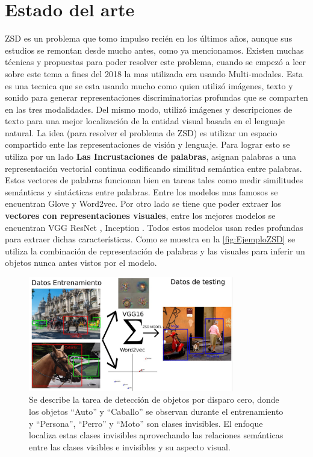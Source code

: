 \section{Estado del arte}
ZSD es un problema que tomo impulso recién en los últimos años, aunque sus estudios se remontan desde mucho antes, como ya mencionamos. Existen muchas técnicas y propuestas para poder resolver este problema, cuando se empezó a leer sobre este tema a fines del 2018 la mas utilizada era usando Multi-modales. Esta es una tecnica que se esta usando mucho como \cite{aytar2017see} quien utilizó imágenes, texto y sonido para generar representaciones discriminatorias profundas que se comparten en las tres modalidades. Del mismo modo, \cite{zhang2017discriminative} utilizó imágenes y descripciones de texto para una mejor localización de la entidad visual basada en el lenguaje natural. La idea (para resolver el problema de ZSD) es utilizar un espacio compartido ente las representaciones de visión y lenguaje.	Para lograr esto se utiliza por un lado \textbf{Las Incrustaciones de palabras}, asignan palabras a una representación vectorial continua codificando similitud semántica entre palabras. Estos vectores de palabras funcionan bien en tareas tales como medir similitudes semánticas y sintácticas entre palabras. Entre los modelos mas famosos se encuentran Glove\cite{pennington-etal-2014-glove} y Word2vec\cite{mikolov2013efficient}. Por otro lado se tiene que poder extraer los \textbf{vectores con representaciones visuales}, entre los mejores modelos se encuentran VGG \cite{simonyan2014very} ResNet \cite{resnet}, Inception \cite{Szegedy_2015_CVPR}. Todos estos modelos usan redes profundas para extraer dichas características.  Como se muestra en la \autoref{fig:EjemploZSD} se utiliza la combinación de representación de palabras y las visuales para inferir un objetos nunca antes vistos por el modelo.\\

\begin{figure}[]
	\centering
	\includegraphics[width=0.8\textwidth]{img/Modelo.jpg}
	\caption{Se describe la tarea de detección de objetos por disparo cero, donde los objetos ``Auto'' y ``Caballo'' se observan  durante el entrenamiento y ``Persona'', ``Perro'' y ``Moto'' son clases invisibles. El enfoque localiza estas clases invisibles aprovechando las relaciones semánticas entre las clases visibles e invisibles y su aspecto visual.}
	\label{fig:EjemploZSD}
\end{figure}

